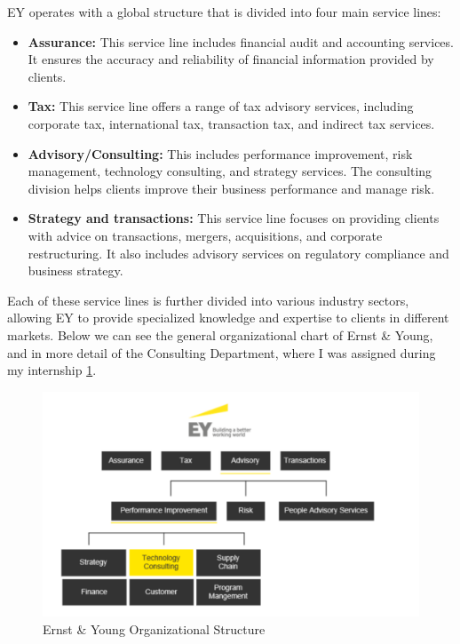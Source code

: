 EY operates with a global structure that is divided into four main service
lines:

\begin{itemize}
    \item \textbf{Assurance:} This service line includes financial audit and accounting services. It ensures the accuracy and reliability of financial information provided by clients.
    \item \textbf{Tax:} This service line offers a range of tax advisory services, including corporate tax, international tax, transaction tax, and indirect tax services.
    \item \textbf{Advisory/Consulting:} This includes performance improvement, risk management, technology consulting, and strategy services. The consulting division helps clients improve their business performance and manage risk.
    \item \textbf{Strategy and transactions:} This service line focuses on providing clients with advice on transactions, mergers, acquisitions, and corporate restructuring. It also includes advisory services on regulatory compliance and business strategy.
\end{itemize}

Each of these service lines is further divided into various industry sectors,
allowing EY to provide specialized knowledge and expertise to clients in
different markets. Below we can see the general organizational chart of Ernst
\& Young, and in more detail of the Consulting Department, where I was assigned
during my internship \ref{fig:ey-structure}.

\begin{figure}[H]
    \centering
    \includegraphics[width=\textwidth]{../figs/org_chart}
    \caption{Ernst \& Young Organizational Structure}
    \label{fig:ey-structure}
\end{figure}

